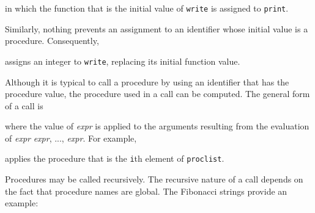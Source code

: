 \noindent in which the function that is the initial value of
\texttt{write} is assigned to \texttt{print}.

Similarly, nothing prevents an assignment to an identifier whose
initial value is a procedure. Consequently,



\noindent
assigns an integer to \texttt{write}, replacing its initial function value.

Although it is typical to call a procedure by using an identifier that
has the procedure value, the procedure used in a call can be
computed. The general form of a call is



\noindent where the value of
\textit{expr} is applied to the
arguments resulting from the evaluation of
\textit{expr}
\textit{expr}, ...,
\textit{expr}. For example,



\noindent
applies the procedure that is the \texttt{i}th element of \texttt{proclist}.

Procedures may be called recursively. The recursive nature of a call
depends on the fact that procedure names are global. The
{\textquotedbl}Fibonacci strings{\textquotedbl} provide an example:



